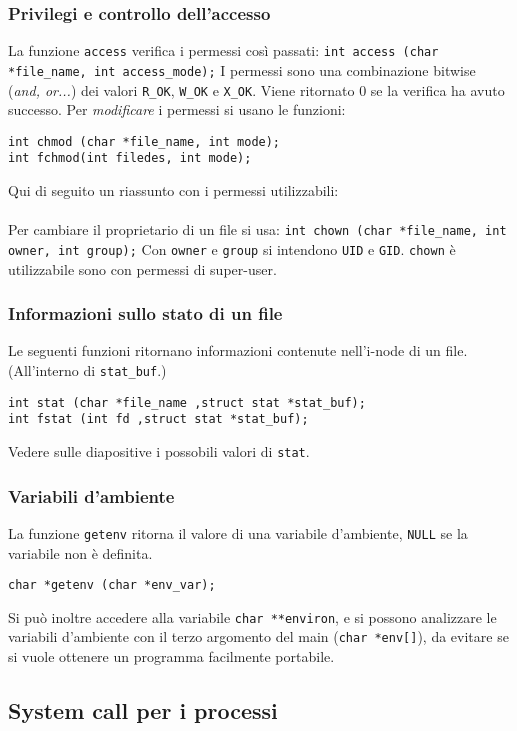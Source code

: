 \documentclass[a4paper]{article}
\begin{document}
\subsubsection{Privilegi e controllo dell'accesso}
La funzione \verb|access| verifica i permessi così passati:
\verb|int access (char *file_name, int access_mode);|
I permessi sono una combinazione bitwise (\textit{and, or...}) dei valori \verb|R_OK|, \verb|W_OK| e \verb|X_OK|. Viene ritornato 0 se la verifica ha avuto successo.
Per \textit{modificare} i permessi si usano le funzioni:
\begin{verbatim}
int chmod (char *file_name, int mode);
int fchmod(int filedes, int mode);
\end{verbatim}

Qui di seguito un riassunto con i permessi utilizzabili: \\ \\
Per cambiare il proprietario di un file si usa:
\verb|int chown (char *file_name, int owner, int group);|
Con \verb|owner| e \verb|group| si intendono \verb|UID| e \verb|GID|. \verb|chown| è utilizzabile sono con permessi di super-user.

\subsubsection{Informazioni sullo stato di un file}
Le seguenti funzioni ritornano informazioni contenute nell'i-node di un file. (All'interno di \verb|stat_buf|.)
\begin{verbatim}
int stat (char *file_name ,struct stat *stat_buf);
int fstat (int fd ,struct stat *stat_buf);
\end{verbatim}
Vedere sulle diapositive i possobili valori di \verb|stat|.

\subsubsection{Variabili d'ambiente}
La funzione \verb|getenv| ritorna il valore di una variabile d'ambiente, \verb|NULL| se la variabile non è definita.
\begin{verbatim}
char *getenv (char *env_var);
\end{verbatim}
Si può inoltre accedere alla variabile \verb|char **environ|, e si possono analizzare le variabili d'ambiente con il terzo argomento del main (\verb|char *env[]|), da evitare se si vuole ottenere un programma facilmente portabile.
\newpage
\subsection{System call per i processi}
\end{document}
